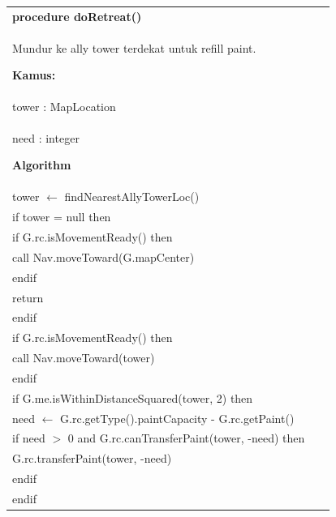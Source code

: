 \documentclass{article}
\newenvironment{pseudobox}
{
\centering
\begin{longtable}{|p{0.94\linewidth}|}
\hline
}
{
\\ \hline
\end{longtable}
\vspace{0.05cm}
}
\begin{document}
\begin{pseudobox}
\textbf{procedure doRetreat()} \\
{ Mundur ke ally tower terdekat untuk refill paint. }

\textbf{Kamus:} \\
\hspace*{1em} tower : MapLocation \\
\hspace*{1em} need : integer

\textbf{Algorithm} \\
\hspace*{1em} tower $\leftarrow$ findNearestAllyTowerLoc() \\

\hspace*{1em} if tower = null then \\
\hspace*{2em} if G.rc.isMovementReady() then \\
\hspace*{3em} call Nav.moveToward(G.mapCenter) \\
\hspace*{2em} endif \\
\hspace*{2em} return \\
\hspace*{1em} endif \\

\hspace*{1em} if G.rc.isMovementReady() then \\
\hspace*{2em} call Nav.moveToward(tower) \\
\hspace*{1em} endif \\

\hspace*{1em} if G.me.isWithinDistanceSquared(tower, 2) then \\
\hspace*{2em} need $\leftarrow$ G.rc.getType().paintCapacity - G.rc.getPaint() \\
\hspace*{2em} if need $>$ 0 and G.rc.canTransferPaint(tower, -need) then \\
\hspace*{3em} G.rc.transferPaint(tower, -need) \\
\hspace*{2em} endif \\
\hspace*{1em} endif
\end{pseudobox}
\end{document}
